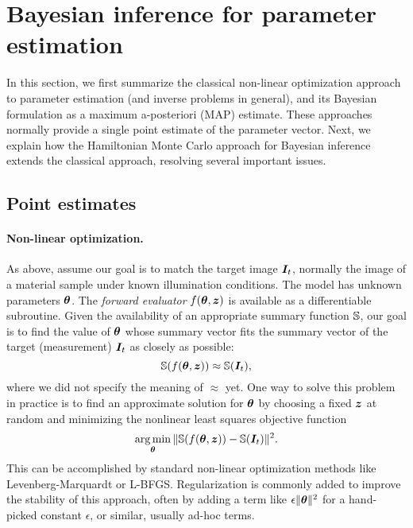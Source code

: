 \section{Bayesian inference for parameter estimation}

In this section, we first summarize the classical non-linear optimization approach to parameter estimation (and inverse problems in general), and its Bayesian formulation as a  maximum a-posteriori (MAP) estimate. These approaches normally provide a single point estimate of the parameter vector. Next, we explain how the Hamiltonian Monte Carlo approach for Bayesian inference extends the classical approach, resolving several important issues.


\subsection{Point estimates}

\paragraph{Non-linear optimization.} As above, assume our goal is to match the target image $\bm{I}_t$, normally the image of a material sample under known illumination conditions. The model has unknown parameters $\bm{\theta}$. The \emph{forward evaluator} $f(\bm{\theta}, \bm{z})$ is available as a differentiable subroutine.  Given the availability of an appropriate summary function $\mathbb{S}$, our goal is to find the value of $\bm{\theta}$ whose summary vector fits the summary vector of the target (measurement) $\bm{I}_t$ as closely as possible:
\begin{equation} \label{eq:approx}
	\mathbb{S}(f(\bm{\theta}, \bm{z})) \approx \mathbb{S}(\bm{I}_t),
\end{equation}
where we did not specify the meaning of $\approx$ yet. One way to solve this problem in practice is to find an approximate solution for $\bm{\theta}$ by choosing a fixed $\bm{z}$ at random and minimizing the nonlinear least squares objective function
\begin{equation}
	\operatorname*{arg\,min}_{\bm{\theta}} \|\mathbb{S}(f(\bm{\theta}, \bm{z})) - \mathbb{S}(\bm{I}_t)\|^2.
\end{equation}
This can be accomplished by standard non-linear optimization methods like Levenberg-Marquardt or L-BFGS. Regularization is commonly added to improve the stability of this approach, often by adding a term like $\epsilon \|\bm{\theta}\|^2$ for a hand-picked constant $\epsilon$, or similar, usually ad-hoc terms.


